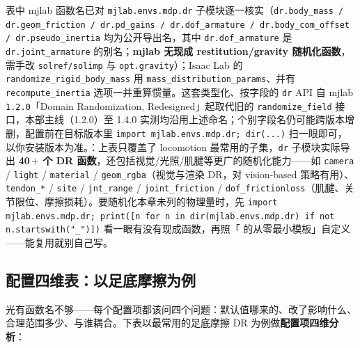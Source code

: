 \begin{finenote}
表中 mjlab 函数名已对 \texttt{mjlab.envs.mdp.dr} 子模块逐一核实（\texttt{dr.body\_mass / dr.geom\_friction / dr.pd\_gains / dr.dof\_armature / dr.body\_com\_offset / dr.pseudo\_inertia} 均为公开导出名，其中 \texttt{dr.dof\_armature} 是 \texttt{dr.joint\_armature} 的别名；\textbf{mjlab 无现成 restitution/gravity 随机化函数}，需手改 \texttt{solref/solimp} 与 \texttt{opt.gravity}）；Isaac Lab 的 \texttt{randomize\_rigid\_body\_mass} 用 \texttt{mass\_distribution\_params}、并有 \texttt{recompute\_inertia} 选项一并重算惯量。这套类型化、按字段的 \texttt{dr} API 自 mjlab \texttt{1.2.0}「Domain Randomization, Redesigned」起取代旧的 \texttt{randomize\_field} 接口，本部主线（1.2.0）至 1.4.0 实测均沿用上述命名；个别字段名仍可能跨版本增删，配置前在目标版本里 \texttt{import mjlab.envs.mdp.dr; dir(...)} 扫一眼即可，以你安装版本为准。：上表只覆盖了 locomotion 最常用的子集，\texttt{dr} 子模块实际导出\textbf{ 40\,$+$ 个 DR 函数}，还包括视觉/光照/肌腱等更广的随机化能力——如 \texttt{camera} / \texttt{light} / \texttt{material} / \texttt{geom\_rgba}（视觉与渲染 DR，对 vision-based 策略有用）、\texttt{tendon\_*} / \texttt{site} / \texttt{jnt\_range} / \texttt{joint\_friction} / \texttt{dof\_frictionloss}（肌腱、关节限位、摩擦损耗）。要随机化本章未列的物理量时，先 \texttt{import mjlab.envs.mdp.dr; print([n for n in dir(mjlab.envs.mdp.dr) if not n.startswith("\_")])} 看一眼有没有现成函数，再照「 的从零最小模板」自定义——能复用就别自己写。
\end{finenote}

\subsection{配置四维表：以足底摩擦为例}
\label{sec:rlmc-dr-func-4d}

光有函数名不够——每个配置项都该问四个问题：默认值哪来的、改了影响什么、合理范围多少、与谁耦合。下表以最常用的足底摩擦 DR 为例做\textbf{配置项四维分析}：

